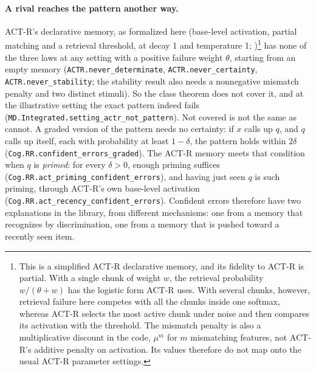 \documentclass[11pt]{article}
\newcommand{\lean}[1]{\texttt{#1}}
\begin{document}
\paragraph{A rival reaches the pattern another way.} ACT-R's declarative
memory, as formalized here (base-level activation, partial matching
and a retrieval threshold, at decay 1 and temperature 1;
\citealp{anderson1998})\footnote{This is a simplified ACT-R declarative
memory, and its fidelity to ACT-R is partial. With a single chunk of
weight $w$, the retrieval probability $w/(\theta+w)$ has the logistic
form ACT-R uses. With several chunks, however, retrieval failure here
competes with all the chunks inside one softmax, whereas ACT-R selects
the most active chunk under noise and then compares its activation
with the threshold. The mismatch penalty is also a multiplicative
discount in the code, $\mu^{m}$ for $m$ mismatching features, not
ACT-R's additive penalty on activation. Its values therefore do not
map onto the usual ACT-R parameter settings.} has none of the three
laws at any setting with a positive failure weight $\theta$, starting
from an empty memory (\lean{ACTR.never\_determinate},
\lean{ACTR.never\_certainty}, \lean{ACTR.never\_stability}; the
stability result also needs a nonnegative mismatch penalty and two
distinct stimuli). So the class theorem does not cover it, and at the
illustrative setting the exact pattern indeed fails
(\lean{MD.Integrated.setting\_actr\_not\_pattern}). Not covered is not
the same as cannot. A graded version of the pattern needs no
certainty: if $x$ calls up $q$, and $q$ calls up itself, each with
probability at least $1-\delta$, the pattern holds within $2\delta$
(\lean{Cog.RR.confident\_errors\_graded}). The ACT-R memory meets that
condition when $q$ is \emph{primed}: for every $\delta>0$, enough
priming suffices (\lean{Cog.RR.act\_priming\_confident\_errors}), and
having just seen $q$ is such priming, through ACT-R's own base-level
activation (\lean{Cog.RR.act\_recency\_confident\_errors}). Confident
errors therefore have two explanations in the library, from different
mechanisms: one from a memory that recognizes by discrimination, one
from a memory that is pushed toward a recently seen item.
\end{document}
